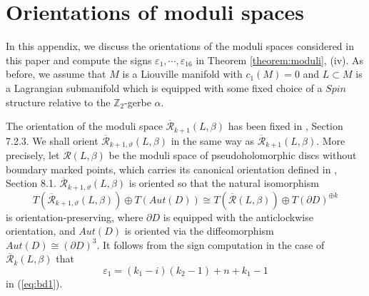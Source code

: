 \documentclass[a4paper]{article}
\numberwithin{equation}{section}
\begin{document}
\section{Orientations of moduli spaces}\label{section:orientation}

In this appendix, we discuss the orientations of the moduli spaces considered in this paper and compute the signs $\varepsilon_1,\cdots,\varepsilon_{16}$ in Theorem \ref{theorem:moduli}, (iv). As before, we assume that $M$ is a Liouville manifold with $c_1(M)=0$ and $L\subset M$ is a Lagrangian submanifold which is equipped with some fixed choice of a $\mathit{Spin}$ structure relative to the $\mathbb{Z}_2$-gerbe $\alpha$.

The orientation of the moduli space $\overline{\mathcal{R}}_{k+1}(L,\beta)$ has been fixed in \cite{ki2}, Section 7.2.3. We shall orient $\overline{\mathcal{R}}_{k+1,\vartheta}(L,\beta)$ in the same way as $\overline{\mathcal{R}}_{k+1}(L,\beta)$. More precisely, let $\mathcal{R}(L,\beta)$ be the moduli space of pseudoholomorphic discs without boundary marked points, which carries its canonical orientation defined in \cite{fooo1}, Section 8.1. $\overline{\mathcal{R}}_{k+1,\vartheta}(L,\beta)$ is oriented so that the natural isomorphism
\begin{equation}
T\left(\overline{\mathcal{R}}_{k+1,\vartheta}(L,\beta)\right)\oplus T\left(\mathit{Aut}(D)\right)\cong T\left(\overline{\mathcal{R}}(L,\beta)\right)\oplus T(\partial D)^{\oplus k}
\end{equation}
is orientation-preserving, where $\partial D$ is equipped with the anticlockwise orientation, and $\mathit{Aut}(D)$ is oriented via the diffeomorphism $\mathit{Aut}(D)\cong(\partial D)^3$. It follows from the sign computation in the case of $\overline{\mathcal{R}}_k(L,\beta)$ that
\begin{equation}
\varepsilon_1=(k_1-i)(k_2-1)+n+k_1-1
\end{equation}
in (\ref{eq:bd1}).
\end{document}
